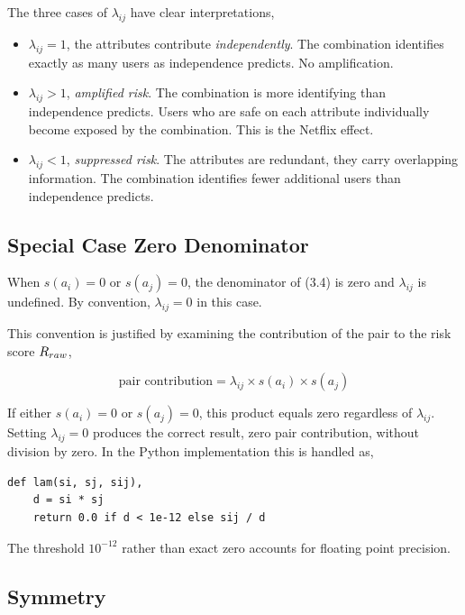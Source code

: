 The three cases of $\lambda_{ij}$ have clear interpretations,

\begin{itemize}
    \item $\lambda_{ij} = 1$, the attributes contribute
    \textit{independently}. The combination identifies
    exactly as many users as independence predicts. No
    amplification.

    \item $\lambda_{ij} > 1$, \textit{amplified risk}.
    The combination is more identifying than independence
    predicts. Users who are safe on each attribute
    individually become exposed by the combination. This
    is the Netflix effect.

    \item $\lambda_{ij} < 1$, \textit{suppressed risk}.
    The attributes are redundant, they carry overlapping
    information. The combination identifies fewer additional
    users than independence predicts.
\end{itemize}

\subsection{Special Case Zero Denominator}
When $s(a_i) = 0$ or $s(a_j) = 0$, the denominator of
(3.4) is zero and $\lambda_{ij}$ is
undefined. By convention, $\lambda_{ij} = 0$ in this case.

This convention is justified by examining the contribution
of the pair to the risk score $R_{raw}$,

\begin{equation}
\text{pair contribution} =
\lambda_{ij} \times s(a_i) \times s(a_j)
\end{equation}

If either $s(a_i) = 0$ or $s(a_j) = 0$, this product
equals zero regardless of $\lambda_{ij}$. Setting
$\lambda_{ij} = 0$ produces the correct result, zero
pair contribution, without division by zero. In the
Python implementation this is handled as,

\begin{lstlisting}
def lam(si, sj, sij),
    d = si * sj
    return 0.0 if d < 1e-12 else sij / d
\end{lstlisting}

The threshold $10^{-12}$ rather than exact zero accounts
for floating point precision.

\subsection{Symmetry}

